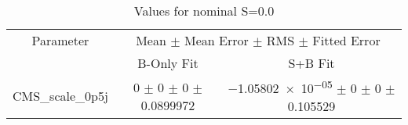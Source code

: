 \begin{table}
\centering
\caption{Values for nominal S=0.0}
\begin{tabular}{ccc}
\toprule
Parameter & \multicolumn{2}{c}{Mean $\pm$ Mean Error $\pm$ RMS $\pm$ Fitted Error}\\
 & B-Only Fit & S+B Fit\\
\midrule
CMS\_scale\_0p5j & \num{0} $\pm$ \num{0} $\pm$ \num{0} $\pm$ \num{0.0899972} & \num{-1.05802e-05} $\pm$ \num{0} $\pm$ \num{0} $\pm$ \num{0.105529}\\
\bottomrule
\end{tabular}
\end{table}
